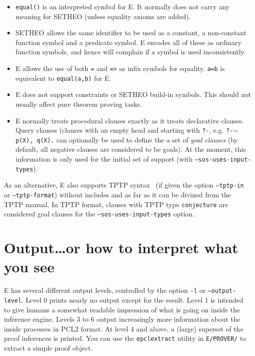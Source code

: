 \documentclass{article}
\begin{document}
\begin{itemize}
\item \texttt{equal()} is an interpreted symbol for E. It normally
  does not carry any meaning for SETHEO (unless equality axioms are
  added).
\item SETHEO allows the same identifier to be used as a constant, a
  non-constant function symbol and a predicate symbol. E encodes all
  of these as ordinary function symbols, and hence will complain if a
  symbol is used inconsistently.
\item E allows the use of both \texttt{=} and \texttt{=>} as infix
  symbols for equality. \texttt{a=b} is equivalent to
  \texttt{equal(a,b)} for E.
\item E does not support constraints or SETHEO build-in symbols. This
  should not usually affect pure theorem proving tasks.
\item E normally treats procedural clauses exactly as it treats
  declarative clauses. Query clauses (clauses with an empty head and
  starting with \texttt{?-}, e.g. \texttt{?-$\sim$p(X), q(X).} can
  optionally be used to define the a set of \emph{goal clauses} (by
  default, all negative clauses are considered to be goals). At the
  moment, this information is only used for the initial set of support
  (with \texttt{--sos-uses-input-types}).
\end{itemize}

As an alternative, E also supports TPTP syntax~\cite{SS:TPTP-97} (if
given the option \texttt{--tptp-in} or \texttt{--tptp-format}) without
includes and as far as it can be divined from the TPTP manual. In TPTP
format, clauses with TPTP type \texttt{conjecture} are considered goal
clauses for the \texttt{--sos-uses-input-types} option.


\section{Output\ldots or how to interpret what you see}
\label{sec:output}

E has several different output levels, controlled by the option
\texttt{-l} or \texttt{--output-level}. Level 0 prints nearly no
output except for the result. Level 1 is intended to give humans a
somewhat readable impression of what is going on inside the inference
engine.  Levels 3 to 6 output increasingly more information about the
inside processes in PCL2 format. At level 4 and above, a (large)
superset of the proof inferences is printed. You can use the
\texttt{epclextract} utility in \texttt{E/PROVER/} to extract a simple
proof object.
\end{document}
